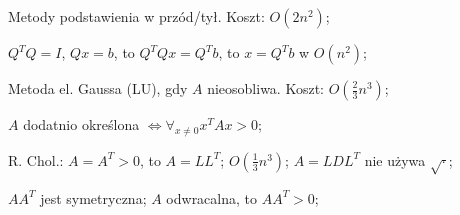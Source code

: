 
\entry
Metody podstawienia w przód/tył. Koszt: $O(2n^2)$;

\entry
$Q^TQ=I$, $Qx=b$, to $Q^TQx=Q^Tb$, to $x=Q^Tb$ w $O(n^2)$;



\entry
Metoda el. Gaussa (LU), gdy $A$ nieosobliwa. Koszt: $O(\frac{2}{3}n^3)$;

\entry
$A$ dodatnio określona $\iff \forall_{x \neq 0} x^TAx>0$;

\entry
R. Chol.:
$A=A^T>0$,
to
$A=LL^T$;
$O(\frac{1}{3}n^3)$;
$A=LDL^T$
nie używa
$\sqrt{\cdot}$;

\entry
$AA^T$ jest symetryczna;
\entry
$A$ odwracalna, to $AA^T>0$;
